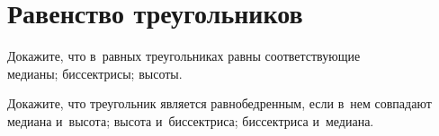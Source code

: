 
\section*{Равенство треугольников}



\setcounter{jeolmsubproblem}{0}%
Докажите, что в~равных треугольниках равны соответствующие
\\
\sp медианы;
\quad
\sp биссектрисы;
\quad
\sp высоты.

\setcounter{jeolmsubproblem}{0}%
Докажите, что треугольник является равнобедренным, если в~нем совпадают
\\
\sp медиана и~высота;
\quad
\sp высота и~биссектриса;
\quad
\sp биссектриса и~медиана.

